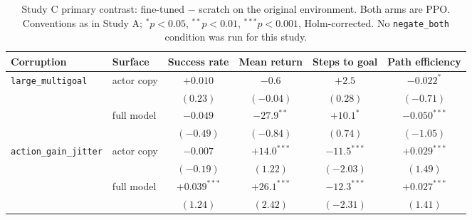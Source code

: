 \begin{table}[htbp]
\centering
\setlength{\tabcolsep}{4pt}
\caption{Study C primary contrast: fine-tuned $-$ scratch on the original
environment. Both arms are PPO. Conventions as in Study A;
${}^{*}p<0.05$, ${}^{**}p<0.01$, ${}^{***}p<0.001$, Holm-corrected.
No \texttt{negate\_both} condition was run for this study.}
\small
\begin{tabular}{llcccc}
\toprule
Corruption & Surface & Success rate & Mean return & Steps to goal & Path efficiency \\
\midrule
\texttt{large\_multigoal} & actor copy & $+0.010$ & $-0.6$ & $+2.5$ & $-0.022^{*}$ \\
 & & \footnotesize$(0.23)$ & \footnotesize$(-0.04)$ & \footnotesize$(0.28)$ & \footnotesize$(-0.71)$ \\[3pt]
 & full model & $-0.049$ & $-27.9^{**}$ & $+10.1^{*}$ & $-0.050^{***}$ \\
 & & \footnotesize$(-0.49)$ & \footnotesize$(-0.84)$ & \footnotesize$(0.74)$ & \footnotesize$(-1.05)$ \\[3pt]
\midrule
\texttt{action\_gain\_jitter} & actor copy & $-0.007$ & $+14.0^{***}$ & $-11.5^{***}$ & $+0.029^{***}$ \\
 & & \footnotesize$(-0.19)$ & \footnotesize$(1.22)$ & \footnotesize$(-2.03)$ & \footnotesize$(1.49)$ \\[3pt]
 & full model & $+0.039^{***}$ & $+26.1^{***}$ & $-12.3^{***}$ & $+0.027^{***}$ \\
 & & \footnotesize$(1.24)$ & \footnotesize$(2.42)$ & \footnotesize$(-2.31)$ & \footnotesize$(1.41)$ \\
\bottomrule
\end{tabular}
\end{table}

